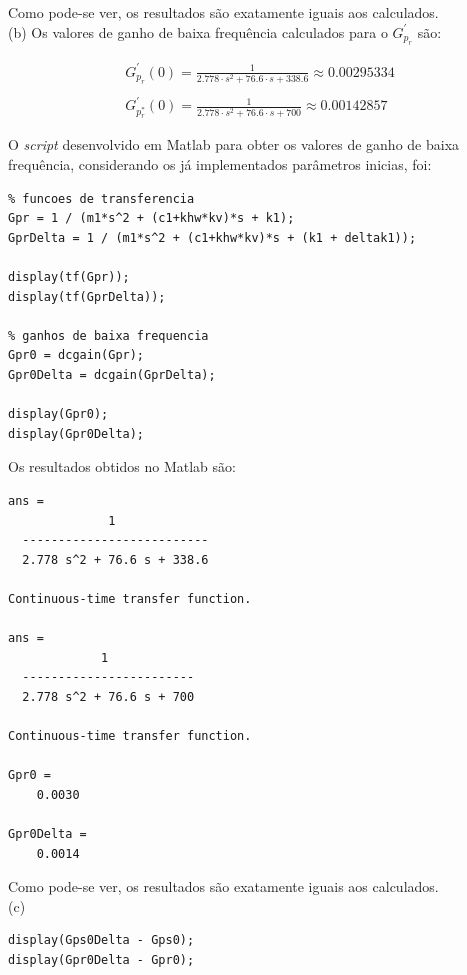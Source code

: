 \documentclass[a4paper,11pt]{article}
\begin{document}
Como pode-se ver, os resultados são exatamente iguais aos calculados. \\

(b) Os valores de ganho de baixa frequência calculados para o $G^\prime_{p_r}$
são:

\begin{gather*}
    G^\prime_{p_r} \left( 0 \right) = \frac{1}{2.778 \cdot s^2 + 76.6 \cdot s +
        338.6} \approx 0.00295334 \\ \\
    G^\prime_{p_r^\ast} \left( 0 \right) = \frac{1}{2.778 \cdot s^2 + 76.6 \cdot
      s + 700} \approx 0.00142857
\end{gather*}

O \textit{script} desenvolvido em Matlab para obter os valores de ganho de baixa
frequência, considerando os já implementados parâmetros inicias, foi:

\begin{lstlisting}
% funcoes de transferencia
Gpr = 1 / (m1*s^2 + (c1+khw*kv)*s + k1);
GprDelta = 1 / (m1*s^2 + (c1+khw*kv)*s + (k1 + deltak1));

display(tf(Gpr));
display(tf(GprDelta));

% ganhos de baixa frequencia
Gpr0 = dcgain(Gpr);
Gpr0Delta = dcgain(GprDelta);

display(Gpr0);
display(Gpr0Delta);
\end{lstlisting}

Os resultados obtidos no Matlab são:

\begin{lstlisting}
ans =
              1
  --------------------------
  2.778 s^2 + 76.6 s + 338.6

Continuous-time transfer function.

ans =
             1
  ------------------------
  2.778 s^2 + 76.6 s + 700
 
Continuous-time transfer function.

Gpr0 =
    0.0030

Gpr0Delta =
    0.0014
\end{lstlisting}

Como pode-se ver, os resultados são exatamente iguais aos calculados. \\

(c)

\begin{lstlisting}
display(Gps0Delta - Gps0);
display(Gpr0Delta - Gpr0);
\end{lstlisting}
\end{document}
